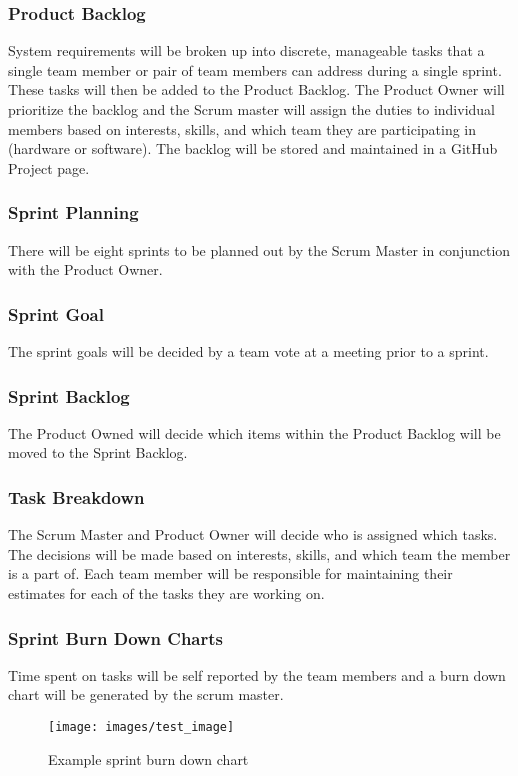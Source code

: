 \subsubsection{Product Backlog}
System requirements will be broken up into discrete, manageable tasks that a single team member or pair of team members can address during a single sprint. These tasks will then be added to the Product Backlog. The Product Owner will prioritize the backlog and the Scrum master will assign the duties to individual members based on interests, skills, and which team they are participating in (hardware or software). The backlog will be stored and maintained in a GitHub Project page.

\subsubsection{Sprint Planning}
There will be eight sprints to be planned out by the Scrum Master in conjunction with the Product Owner.

\subsubsection{Sprint Goal}
The sprint goals will be decided by a team vote at a meeting prior to a sprint.

\subsubsection{Sprint Backlog}
The Product Owned will decide which items within the Product Backlog will be moved to the Sprint Backlog.

\subsubsection{Task Breakdown}
The Scrum Master and Product Owner will decide who is assigned which tasks. The decisions will be made based on interests, skills, and which team the member is a part of. Each team member will be responsible for maintaining their estimates for each of the tasks they are working on. 

\subsubsection{Sprint Burn Down Charts}
Time spent on tasks will be self reported by the team members and a burn down chart will be generated by the scrum master.

\begin{figure}[h!]
    \centering
    \texttt{[image: images/test\_image]}
    \caption{Example sprint burn down chart}
\end{figure}

